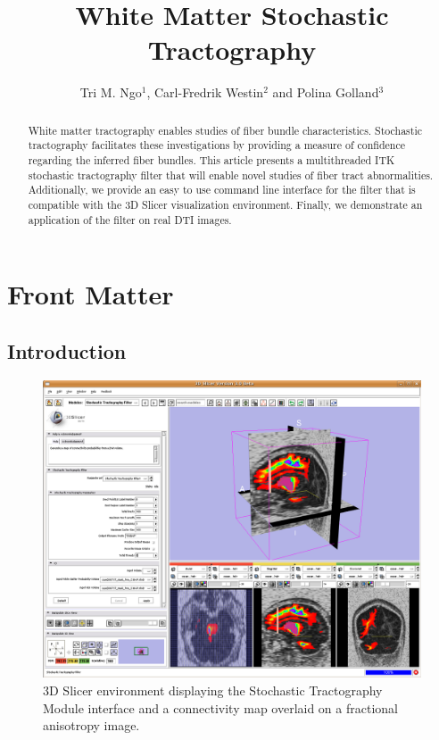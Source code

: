 \documentclass{InsightArticle}
\title{White Matter Stochastic Tractography}
\author{Tri M. Ngo$^{1}$, Carl-Fredrik Westin$^{2}$ and Polina Golland$^{3}$}
\begin{document}
\ifpdf
\else
\fi


\maketitle


\ifhtml
\chapter*{Front Matter\label{front}}
\fi


\begin{abstract}
\noindent
White matter tractography enables studies of fiber bundle characteristics.  Stochastic tractography facilitates these investigations by providing a measure of confidence regarding the inferred fiber bundles.  This article presents a multithreaded ITK stochastic tractography filter that will enable novel studies of fiber tract abnormalities.  Additionally, we provide an easy to use command line interface for the filter that is compatible with the 3D Slicer visualization environment. Finally, we demonstrate an application of the filter on real DTI images.
\end{abstract}

\tableofcontents

\section{Introduction}

\begin{figure}
\center
	\includegraphics[width=0.75\linewidth]{slicerinterface}
	\caption{3D Slicer environment displaying the Stochastic Tractography Module interface and a connectivity map overlaid on a fractional anisotropy image.}
	\label{fig:Intro}
\end{figure}
\end{document}

